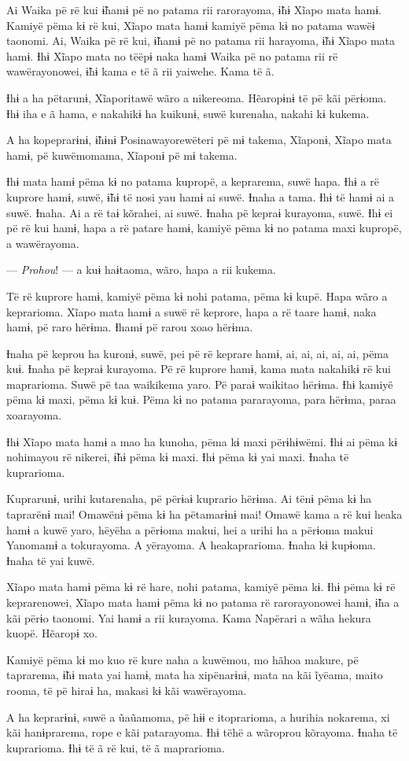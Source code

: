 Ai Waika pë rë kui ɨ̃hamɨ pë no patama rii rarorayoma, ɨ̃hɨ Xĩapo mata
hamɨ. Kamiyë pëma kɨ rë kui, Xĩapo mata hamɨ kamiyë pëma kɨ no patama
wawëɨ taonomi. Ai, Waika pë rë kui, ɨ̃hamɨ pë no patama rii harayoma, ɨ̃hɨ
Xĩapo mata hamɨ. Ɨhɨ Xĩapo mata no tëëpɨ naka hamɨ Waika pë no patama
rii rë wawërayonowei, ɨ̃hɨ kama e të ã rii yaiwehe. Kama të ã. 

Ɨhɨ a ha pëtarunɨ, Xĩaporitawë wãro a nikereoma. Hẽaropɨnɨ të pë kãi
përɨoma. Ɨhɨ iha e ã hama, e nakahikɨ ha kuikunɨ, suwë kurenaha, nakahi
kɨ kukema. 

A ha kopeprarɨnɨ, ɨ̃hɨnɨ Posinawayorewëteri pë mɨ takema, Xĩaponɨ, Xĩapo
mata hamɨ, pë kuwëmomama, Xĩaponɨ pë mɨ takema. 

Ɨhɨ mata hamɨ pëma kɨ no patama kupropë, a keprarema, suwë hapa. Ɨhɨ a
rë kuprore hamɨ, suwë, ɨ̃hɨ të nosi yau hamɨ ai suwë. Ɨnaha a tama. Ɨhɨ
të hamɨ ai a suwë. Ɨnaha. Ai a rë taɨ kõrahei, ai suwë. Ɨnaha pë kepraɨ
kurayoma, suwë. Ɨhɨ ei pë rë kui hamɨ, hapa a rë patare hamɨ, kamiyë
pëma kɨ no patama maxi kupropë, a wawërayoma. 

--- \textit{Prohou}! --- a kuɨ haɨtaoma, wãro, hapa a rii kukema. 

Të rë kuprore hamɨ, kamiyë pëma kɨ nohi patama, pëma kɨ kupë. Hapa wãro
a keprarioma. Xĩapo mata hamɨ a suwë rë keprore, hapa a rë taare hamɨ,
naka hamɨ, pë raro hërɨma. Ɨhamɨ pë rarou xoao hërɨma. 

Ɨnaha pë keprou ha kuronɨ, suwë, pei pë rë keprare hamɨ, ai, ai, ai, ai,
ai, pëma kuɨ. Ɨnaha pë kepraɨ kurayoma. Pë rë kuprore hamɨ, kama mata
nakahikɨ rë kui maprarioma. Suwë pë taa waikikema yaro. Pë paraɨ
waikitao hërɨma. Ɨhɨ kamiyë pëma kɨ maxi, pëma kɨ kuɨ. Pëma kɨ no patama
pararayoma, para hërɨma, paraa xoarayoma. 

Ɨhɨ Xĩapo mata hamɨ a mao ha kunoha, pëma kɨ maxi përɨhɨwëmi. Ɨhɨ ai
pëma kɨ nohimayou rë nikerei, ɨ̃hɨ pëma kɨ maxi. Ɨhɨ pëma kɨ yai maxi.
Ɨnaha të kuprarioma. 

Kuprarunɨ, urihi kutarenaha, pë përɨaɨ kuprario hërɨma. Ai tënɨ pëma kɨ
ha taprarënɨ mai! Omawënɨ pëma kɨ ha pëtamarɨnɨ mai! Omawë kama a rë kui
heaka hamɨ a kuwë yaro, hëyëha a përɨoma makui, hei a urihi ha a përɨoma
makui Yanomamɨ a tokurayoma. A yërayoma. A heakaprarioma. Ɨnaha kɨ
kupɨoma. Ɨnaha të yai kuwë. 

Xĩapo mata hamɨ pëma kɨ rë hare, nohi patama, kamiyë pëma kɨ. Ɨhɨ pëma
kɨ rë keprarenowei, Xĩapo mata hamɨ pëma kɨ no patama rë rarorayonowei
hamɨ, ɨ̃ha a kãi përɨo taonomi. Yai hamɨ a rii kurayoma. Kama Napërari a
wãha hekura kuopë. Hẽaropɨ xo. 

Kamiyë pëma kɨ mo kuo rë kure naha a kuwëmou, mo hãhoa makure, pë
taprarema, ɨ̃hɨ mata yai hamɨ, mata ha xipënarɨnɨ, mata na kãi ĩyëama,
maito rooma, të pë hiraɨ ha, makasi kɨ kãi wawërayoma. 

A ha keprarɨnɨ, suwë a ũaũamoma, pë hɨɨ e itoprarioma, a hurihia
nokarema, xi kãi hanɨprarema, rope e kãi patarayoma. Ɨhɨ tëhë a wãroprou
kõrayoma. Ɨnaha të kuprarioma. Ɨhɨ të ã rë kui, të ã maprarioma. 

\begin{center} \end{center}

